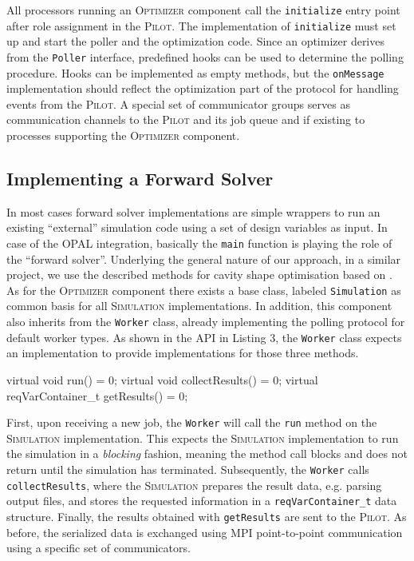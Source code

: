 \documentclass[%
reprint,
amsmath,amssymb,
aps,
prstab,
]{revtex4-1}
\begin{document}
All processors running an \textsc{Optimizer} component call the
  \texttt{initialize} entry point after role assignment in the
  \textsc{Pilot}.
The implementation of \texttt{initialize} must set up and start the poller and
  the optimization code.
Since an optimizer derives from the \texttt{Poller} interface, predefined
  hooks can be used to determine the polling procedure.
Hooks can be implemented as empty methods, but the \texttt{onMessage}
  implementation should reflect the optimization part of the protocol for
  handling events from the \textsc{Pilot}.
A special set of communicator groups serves as communication channels to the
  \textsc{Pilot} and its job queue and if existing to processes supporting the
  \textsc{Optimizer} component.


\subsection{Implementing a Forward Solver}

In most cases forward solver implementations are simple wrappers to run
  an existing ``external'' simulation code using a set of design variables as
  input. In case of the OPAL integration, basically the \texttt{main} function is
  playing the role of the ``forward solver''. Underlying the general nature of our approach, 
  in a similar project, we use the described methods for cavity shape optimisation based on \cite{ARBENZ2008381}. 
As for the \textsc{Optimizer} component there exists a base class, labeled
  \texttt{Simulation} as common basis for all \textsc{Simulation}
  implementations.
In addition, this component also inherits from the \texttt{Worker} class,
  already implementing the polling protocol for default worker types.
As shown in the API in Listing 3, the \texttt{Worker} class expects an
  implementation to provide implementations for those three methods.

\begin{code}
virtual void run() = 0;
virtual void collectResults() = 0;
virtual reqVarContainer_t getResults() = 0;
\end{code}

First, upon receiving a new job, the \texttt{Worker} will call the
  \texttt{run} method on the \textsc{Simulation} implementation.
This expects the \textsc{Simulation} implementation to run the simulation in a
  \textit{blocking} fashion, meaning the method call blocks and does not return
  until the simulation has terminated.
Subsequently, the \texttt{Worker} calls \texttt{collectResults}, where the
  \textsc{Simulation} prepares the result data, e.g. parsing output files,
  and stores the requested information in a \texttt{reqVarContainer\_t} data
  structure.
Finally, the results obtained with \texttt{getResults} are sent to the
  \textsc{Pilot}.
As before, the serialized data is exchanged using MPI point-to-point
  communication using a specific set of communicators.
\end{document}
